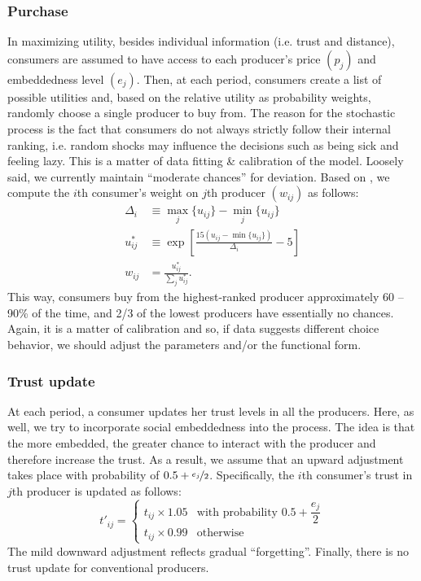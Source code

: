 \documentclass[11pt, oneside]{article}
\begin{document}
\subsubsection{Purchase}
In maximizing utility, besides individual information (i.e. trust and distance), consumers are assumed to have access to each producer's price $(p_j)$ and embeddedness level $(e_j)$. Then, at each period, consumers create a list of possible utilities and, based on the relative utility as probability weights, randomly choose a single producer to buy from. The reason for the stochastic process is the fact that consumers do not always strictly follow their internal ranking, i.e. random shocks may influence the decisions such as being sick and feeling lazy. This is a matter of data fitting \& calibration of the model. Loosely said, we currently maintain ``moderate chances'' for deviation. Based on \textcite{Walter2008}, we compute the $i$th consumer's weight on $j$th producer $(w_{ij})$ as follows:
\begin{align*}
  \Delta_i &\equiv \max_j\{u_{ij}\} - \min_j\{u_{ij}\} \\
  u^*_{ij} &\equiv \exp \left[\frac{15(u_{ij} - \min\{u_{ij}\})}{\Delta_i} - 5 \right] \\
  w_{ij} &= \frac{u^*_{ij}}{\sum_j u^*_{ij}} .
\end{align*}
This way, consumers buy from the highest-ranked producer approximately 60 -- 90\% of the time, and 2/3 of the lowest producers have essentially no chances. Again, it is a matter of calibration and so, if data suggests different choice behavior, we should adjust the parameters and/or the functional form.

\subsubsection{Trust update}
At each period, a consumer updates her trust levels in all the producers. Here, as well, we try to incorporate social embeddedness into the process. The idea is that the more embedded, the greater chance to interact with the producer and therefore increase the trust. As a result, we assume that an upward adjustment takes place with probability of $0.5 + \nicefrac{e_j}{2}$. Specifically, the $i$th consumer's trust in $j$th producer is updated as follows:
\begin{displaymath}
t'_{ij} =
\begin{cases}
t_{ij} \times 1.05 & \text{with probability } 0.5 + \dfrac{e_j}{2}\\
t_{ij} \times 0.99 & \text{otherwise}
\end{cases}
\end{displaymath}
The mild downward adjustment reflects gradual ``forgetting''. Finally, there is no trust update for conventional producers.
\end{document}
